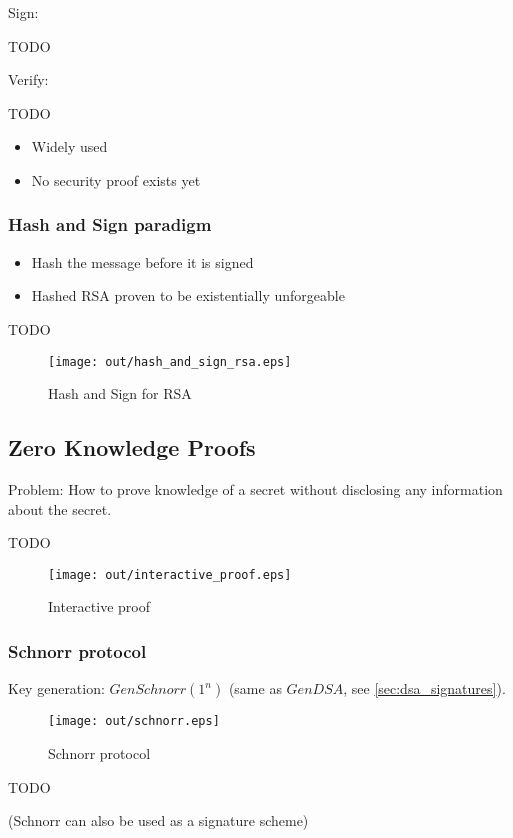 \documentclass[a4paper]{article}
\begin{document}
Sign:

TODO

Verify:

TODO

\begin{itemize}
  \item Widely used
  \item No security proof exists yet
\end{itemize}

\subsubsection{Hash and Sign paradigm}

\begin{itemize}
  \item Hash the message before it is signed
  \item Hashed RSA proven to be existentially unforgeable
\end{itemize}

TODO

\begin{figure}[h!]
  \centering
  \texttt{[image: out/hash\_and\_sign\_rsa.eps]}
  \caption{Hash and Sign for RSA}
  \label{fig:hash_and_sign_rsa}
\end{figure}
\FloatBarrier

\subsection{Zero Knowledge Proofs}

Problem: How to prove knowledge of a secret without disclosing any information
about the secret.

TODO

\begin{figure}[h!]
  \centering
  \texttt{[image: out/interactive\_proof.eps]}
  \caption{Interactive proof}
  \label{fig:interactive_proof}
\end{figure}
\FloatBarrier

\subsubsection{Schnorr protocol}

Key generation: $GenSchnorr(1^{n})$ (same as $GenDSA$, see
\ref{sec:dsa_signatures}).

\begin{figure}[h!]
  \centering
  \texttt{[image: out/schnorr.eps]}
  \caption{Schnorr protocol}
  \label{fig:schnorr}
\end{figure}
\FloatBarrier

TODO

(Schnorr can also be used as a signature scheme)
\end{document}

